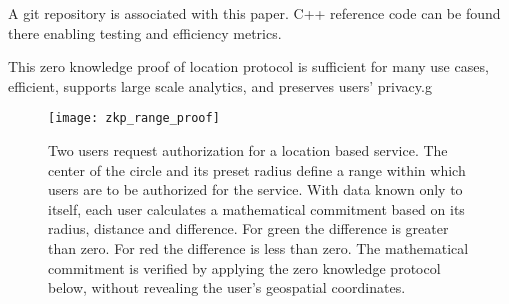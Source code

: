 \documentclass{article}
\begin{document}
A git repository is associated with this paper. C++ reference code can be found there enabling testing and efficiency metrics. 

This zero knowledge proof of location protocol is sufficient for many use cases, efficient, supports large scale analytics, and preserves users' privacy.g


\begin{figure}[!htb]
	\hspace*{-2cm}
	\texttt{[image: zkp\_range\_proof]}
	\caption{Two users request authorization for a location based service. The center of the circle and its preset radius define a range within which users are to be authorized for the service. With data known only to itself, each user calculates a mathematical commitment based on its radius, distance and difference.  For green the difference is greater than zero. For red the difference is less than zero. The mathematical commitment is verified by applying the zero knowledge protocol below, without revealing the user's geospatial coordinates.}
\end{figure}
\end{document}
